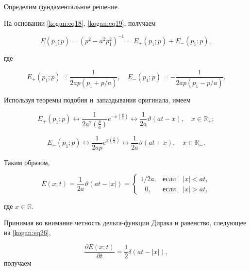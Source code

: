 Определим фундаментальное решение. 

На основании \eqref{kogan:eq18}, \eqref{kogan:eq19}, получаем 

$$

E(p_1 ;p)=(p^2-a^2p_1^2 )^{-1}=E_+ (p_1 ;p)+E_- (p_1 ;p),

$$

где 

$$

E_+  (p_1;p )=\frac{1}{2ap(p_1 +p / a )}, \quad 

E_- (p_1 ;p )=-\frac{1}{2ap(p_1 -p/a )}.

$$ 

Используя теоремы подобия и~запаздывания оригинала, имеем

$$

E_+ (p_1 ;p ) \leftrightarrow \frac{1}{2a^2(\frac{p}{a} )}e^{-x (\frac{p}{a} )} \leftrightarrow 

\frac{1}{2a}\vartheta (at-x), \quad x\in \mathbb R_+;

$$

$$

E_- (p_1 ;p )  \leftrightarrow \frac{1}{2ap}e^{x(\frac{p}{a} )} \leftrightarrow 

\frac{1}{2a}\vartheta (at+x),\quad  x\in \mathbb R_-.

$$

Таким образом, 

\begin{equation}

\label{kogan:eq26}

E(x;t)=\frac{1}{2a}\vartheta (at- |  x |  )=\begin{cases}

1/2a, & \text{если} \quad  |  x |  <at,\\

~~~0, &\text{если} \quad  |  x |  >at, 

\end{cases}

\end{equation}

где $x\in  \mathbb R.$



Принимая во внимание четность дельта-функции Дирака и равенство, следующее из \eqref{kogan:eq26},

$$\frac{\partial E(x;t)}{\partial t}=\frac{1}{2}\delta 

(at- |  x |  ),$$ получаем 

$$


